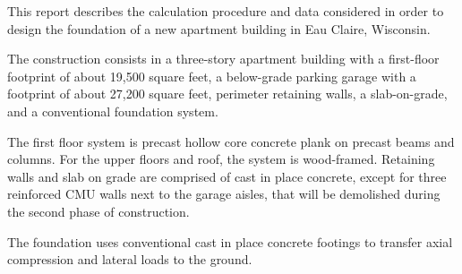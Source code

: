This report describes the calculation procedure and data considered in order to design the foundation of a new apartment building in Eau Claire, Wisconsin.

The construction consists in a three-story apartment building with a first-floor footprint of about 19,500 square feet, a below-grade parking garage with a footprint of about 27,200 square feet, perimeter retaining walls, a slab-on-grade, and a conventional foundation system.

The first floor system is precast hollow core concrete plank on precast beams and columns. For the upper floors and roof, the system is wood-framed. Retaining walls and slab on grade are comprised of cast in place concrete, except for three reinforced CMU walls next to the garage aisles, that will be demolished during the second phase of construction.

The foundation uses conventional cast in place concrete footings to transfer axial compression and lateral loads to the ground.



